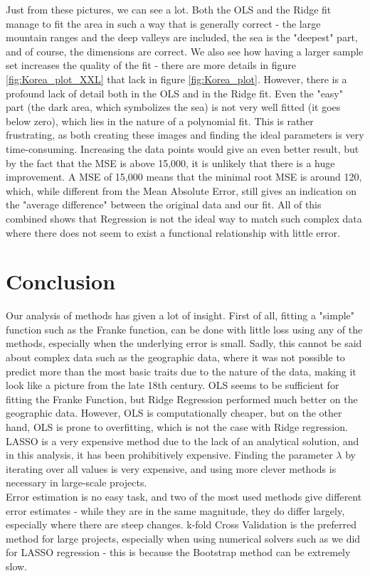 \documentclass[11pt,a4paper,titlepage]{article}
\begin{document}
Just from these pictures, we can see a lot. Both the OLS and the Ridge fit manage to fit the area in such a way that is generally correct - the large mountain ranges and the deep valleys are included, the sea is the "deepest" part, and of course, the dimensions are correct. We also see how having a larger sample set increases the quality of the fit - there are more details in figure \ref{fig:Korea_plot_XXL} that lack in figure \ref{fig:Korea_plot}.  However, there is a profound lack of detail both in the OLS and in the Ridge fit. Even the "easy" part (the dark area, which symbolizes the sea) is not very well fitted (it goes below zero), which lies in the nature of a polynomial fit. This is rather frustrating, as both creating these images and finding the ideal parameters is very time-consuming. Increasing the data points would give an even better result, but by the fact that the MSE is above 15,000, it is unlikely that there is a huge improvement. A MSE of 15,000 means that the minimal root MSE is around 120, which, while different from the Mean Absolute Error, still gives an indication on the "average difference" between the original data and our fit. All of this combined shows that Regression is not the ideal way to match such complex data where there does not seem to exist a functional relationship with little error. 
\section{Conclusion}
Our analysis of methods has given a lot of insight. First of all, fitting a "simple" function such as the  Franke function, can be done with little loss using any of the methods, especially when the underlying error is small. Sadly, this cannot be said about complex data such as the geographic data, where it was not possible to predict more than the most basic traits due to the nature of the data, making it look like a picture from the late 18th century. OLS seems to be sufficient for fitting the Franke Function, but Ridge Regression performed much better on the geographic data. However, OLS is computationally cheaper, but on the other hand, OLS is prone to overfitting, which is not the case with Ridge regression. LASSO is a very expensive method due to the lack of an analytical solution, and in this analysis, it has been prohibitively expensive. Finding the parameter $\lambda$ by iterating over all values is very expensive, and using more clever methods is necessary in large-scale projects. \\
Error estimation is no easy task, and two of the most used methods give different error estimates - while they are in the same magnitude, they do differ largely, especially where there are steep changes. k-fold Cross Validation is the preferred method for large projects, especially when using numerical solvers such as we did for LASSO regression - this is because the Bootstrap method can be extremely slow.
\end{document}
